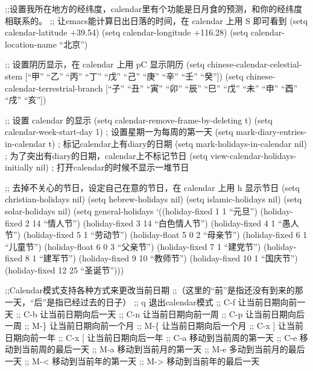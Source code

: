 \documentclass[11pt]{article}
\begin{document}
\begin{itemize}
;;设置我所在地方的经纬度，calendar里有个功能是日月食的预测，和你的经纬度相联系的。
;; 让emacs能计算日出日落的时间，在 calendar 上用 S 即可看到
(setq calendar-latitude +39.54)
(setq calendar-longitude +116.28)
(setq calendar-location-name ``北京'')

;; 设置阴历显示，在 calendar 上用 pC 显示阴历
(setq chinese-calendar-celestial-stem
  [``甲'' ``乙'' ``丙'' ``丁'' ``戊'' ``己'' ``庚'' ``辛'' ``壬'' ``癸''])
(setq chinese-calendar-terrestrial-branch
  [``子'' ``丑'' ``寅'' ``卯'' ``辰'' ``巳'' ``戊'' ``未'' ``申'' ``酉'' ``戌'' ``亥''])

;; 设置 calendar 的显示
(setq calendar-remove-frame-by-deleting t)
(setq calendar-week-start-day 1)            ; 设置星期一为每周的第一天
(setq mark-diary-entries-in-calendar t)     ; 标记calendar上有diary的日期
(setq mark-holidays-in-calendar nil)        ; 为了突出有diary的日期，calendar上不标记节日
(setq view-calendar-holidays-initially nil) ; 打开calendar的时候不显示一堆节日

;; 去掉不关心的节日，设定自己在意的节日，在 calendar 上用 h 显示节日
(setq christian-holidays nil)
(setq hebrew-holidays nil)
(setq islamic-holidays nil)
(setq solar-holidays nil)
(setq general-holidays `((holiday-fixed 1 1 ``元旦'')
                         (holiday-fixed 2 14 ``情人节'')
                         (holiday-fixed 3 14 ``白色情人节'')
                         (holiday-fixed 4 1 ``愚人节'')
                         (holiday-fixed 5 1 ``劳动节'')
                         (holiday-float 5 0 2 ``母亲节'')
                         (holiday-fixed 6 1 ``儿童节'')
                         (holiday-float 6 0 3 ``父亲节'')
                         (holiday-fixed 7 1 ``建党节'')
                         (holiday-fixed 8 1 ``建军节'')
                         (holiday-fixed 9 10 ``教师节'')
                         (holiday-fixed 10 1 ``国庆节'')
                         (holiday-fixed 12 25 ``圣诞节'')))

;;Calendar模式支持各种方式来更改当前日期
;;（这里的“前”是指还没有到来的那一天，“后”是指已经过去的日子）
;;  q      退出calendar模式
;; C-f     让当前日期向前一天
;; C-b     让当前日期向后一天
;; C-n     让当前日期向前一周
;; C-p     让当前日期向后一周
;; M-\}     让当前日期向前一个月
;; M-\{     让当前日期向后一个月
;; C-x ]   让当前日期向前一年
;; C-x [   让当前日期向后一年
;; C-a     移动到当前周的第一天
;; C-e     移动到当前周的最后一天
;; M-a     移动到当前月的第一天
;; M-e     多动到当前月的最后一天
;; M-<     移动到当前年的第一天
;; M->     移动到当前年的最后一天


\end{itemize}
\end{document}
